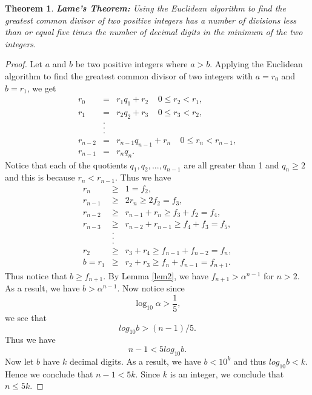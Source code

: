 \documentclass[12pt,letterpaper]{book}
\newtheorem{theorem}{Theorem}
\begin{document}
\begin{theorem}\textbf{Lame's Theorem:} 
Using the Euclidean algorithm to find the greatest common divisor of
two positive integers  has a number of divisions less than or equal
five times the number of decimal digits in the minimum of the two
integers.
\end{theorem}

\begin{proof}
Let $a$ and $b$ be two positive integers where $a>b$.  Applying the
Euclidean algorithm to find the greatest common divisor of two
integers with $a=r_0$ and $b=r_1$, we get
\begin{eqnarray*}
r_0&=&r_1q_1+r_2 \ \ \ \ \ 0\leq r_2<r_1, \\
r_1&=&r_2q_2+r_3 \ \ \ \ \ 0\leq r_3<r_2, \\
 &.&    \\
 &.&    \\
&.&    \\
r_{n-2}&=&r_{n-1}q_{n-1}+r_{n} \ \ \ \ \ 0\leq r_{n}<r_{n-1}, \\
r_{n-1}&=&r_{n}q_{n}.
\end{eqnarray*}
Notice that each of the quotients $q_1,q_2,...,q_{n-1}$ are all
greater than 1 and $q_n\geq 2$ and this is because $r_n<r_{n-1}$.
Thus we have
\begin{eqnarray*}
r_n&\geq& 1=f_2,\\
r_{n-1}&\geq& 2r_n\geq 2f_2=f_3,\\
r_{n-2}&\geq& r_{n-1}+r_n\geq f_3+f_2=f_4,\\
r_{n-3}&\geq& r_{n-2}+r_{n-1}\geq f_4+f_3=f_5,\\
&.&\\
&.&\\
&.&\\
r_2&\geq& r_3+r_4\geq f_{n-1}+f_{n-2}=f_n,\\
b=r_1&\geq& r_2+r_3\geq f_n+f_{n-1}=f_{n+1}.
\end{eqnarray*}
Thus notice that $b\geq f_{n+1}$.  By Lemma \ref{lem2}, we have
$f_{n+1}>\alpha^{n-1}$ for $n>2$.  As a result, we have
$b>\alpha^{n-1}$.  Now notice since
\begin{equation*}
\log_{10}\alpha>\frac{1}{5},
\end{equation*}
 we see that
\begin{equation*}
log_{10}b>(n-1)/5.
\end{equation*}
Thus we have
\begin{equation*}
n-1<5log_{10}b.
\end{equation*}
Now let $b$ have $k$ decimal digits. As a result, we have $b<10^k$
and thus $log_{10}b<k$. Hence we conclude that $n-1<5k$.  Since $k$
is an integer, we conclude that $n\leq 5k$.
\end{proof}
\end{document}
